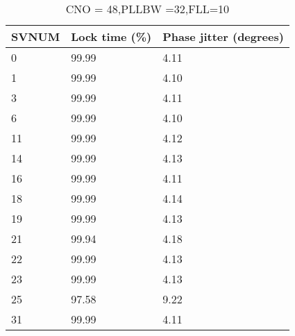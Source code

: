 \begin{table}[!htb]
\centering
\begin{tabular}{|l|l|l|}
\hline
\rowcolor[HTML]{C0C0C0} 
SVNUM & Lock time (\%) & Phase jitter (degrees) \\ \hline
0     & 99.99  & 4.11          \\ \hline
\rowcolor[HTML]{EFEFEF} 
1     & 99.99   & 4.10         \\ \hline
3     & 99.99  & 4.11          \\ \hline
\rowcolor[HTML]{EFEFEF} 
6     & 99.99  & 4.10          \\ \hline
11    & 99.99  & 4.12          \\ \hline
\rowcolor[HTML]{EFEFEF} 
14    & 99.99  & 4.13          \\ \hline
16    & 99.99  & 4.11         \\ \hline
\rowcolor[HTML]{EFEFEF} 
18    & 99.99  & 4.14         \\ \hline
19    & 99.99  & 4.13          \\ \hline
\rowcolor[HTML]{EFEFEF} 
21    & 99.94  & 4.18          \\ \hline
22    & 99.99  & 4.13         \\ \hline
\rowcolor[HTML]{EFEFEF} 
23    & 99.99  & 4.13          \\ \hline
25    & 97.58  & 9.22          \\ \hline
\rowcolor[HTML]{EFEFEF} 
31    & 99.99  & 4.11          \\ \hline
\end{tabular}
\caption{CNO = 48,PLLBW =32,FLL=10}
\label{my-label}
\end{table}



